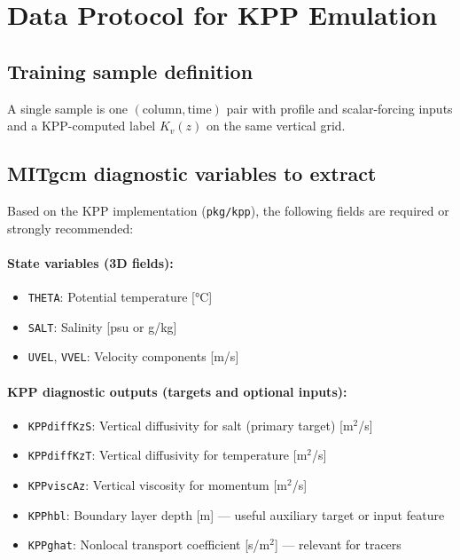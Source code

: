 \documentclass[11pt, a4paper]{article}
\begin{document}
\section{Data Protocol for KPP Emulation}

\subsection{Training sample definition}
A single sample is one $(\text{column}, \text{time})$ pair with profile and scalar-forcing inputs and a KPP-computed label $K_v(z)$ on the same vertical grid.

\subsection{MITgcm diagnostic variables to extract}

Based on the KPP implementation (\texttt{pkg/kpp}), the following fields are required or strongly recommended:

\paragraph{State variables (3D fields):}
\begin{itemize}
    \item \texttt{THETA}: Potential temperature [°C]
    \item \texttt{SALT}: Salinity [psu or g/kg]
    \item \texttt{UVEL}, \texttt{VVEL}: Velocity components [m/s]
\end{itemize}

\paragraph{KPP diagnostic outputs (targets and optional inputs):}
\begin{itemize}
    \item \texttt{KPPdiffKzS}: Vertical diffusivity for salt (primary target) [m$^2$/s]
    \item \texttt{KPPdiffKzT}: Vertical diffusivity for temperature [m$^2$/s]
    \item \texttt{KPPviscAz}: Vertical viscosity for momentum [m$^2$/s]
    \item \texttt{KPPhbl}: Boundary layer depth [m] — useful auxiliary target or input feature
    \item \texttt{KPPghat}: Nonlocal transport coefficient [s/m$^2$] — relevant for tracers
\end{itemize}
\end{document}
